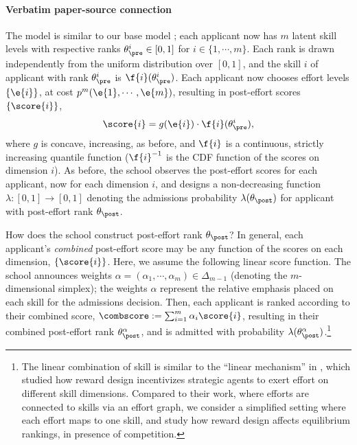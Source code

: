 \documentclass[10pt]{article}
\begin{document}
\paragraph{Verbatim paper-source connection}
\begin{ReviewVerbatim}
 The model is similar to our base model ; each applicant now has $m$ latent skill levels with respective ranks $\theta_\pre^i \in [0,1]$ for $i\in \{1, \cdots, m\}$. Each rank is drawn independently from the uniform distribution over $[0,1]$, and the skill $i$ of applicant with rank $\theta_\pre^i$ is $\f{i}(\theta_\pre^i)$. Each applicant now chooses effort levels $\{ \e{i} \}$, at cost $p^m( \e{1}, \cdots, \e{m})$, resulting in post-effort scores $\{\score{i}\}$,
\begin{equation*}
\score{i} = g(\e{i})\cdot \f{i}(\theta_\pre^i),
\end{equation*}
where $g$ is concave, increasing, as before, and $\f{i}$ is a continuous, strictly increasing quantile function (${\f{i}}^{-1}$ is the CDF function of the scores on dimension $i$). As before, the school observes the post-effort scores for each applicant, now for each dimension $i$, and designs a non-decreasing function $\lambda : [0,1] \to [0,1]$ denoting the admissions probability $\lambda(\theta_\post)$ for applicant with post-effort rank $\theta_\post$.


How does the school construct post-effort rank $\theta_\post$? In general, each applicant's \textit{combined} post-effort score may be any function of the scores on each dimension, $\{\score{i}\}$. Here, we assume the following linear score function. The school announces weights $\alpha = (\alpha_1, \cdots, \alpha_m) \in \Delta_{m-1}$ (denoting the $m$-dimensional simplex); the weights $\alpha$ represent the relative emphasis placed on each skill for the admissions decision. Then, each applicant is ranked according to their combined score, $\combscore := \sum_{i=1}^m \alpha_i\score{i}$, resulting in their combined post-effort rank $\theta_\post^\alpha$, and is admitted with probability $\lambda(\theta_\post^\alpha)$.\footnote{The linear combination of skill is similar to the ``linear mechanism'' in \citet{kleinberg18investeffort}, which studied how reward design incentivizes strategic agents to exert effort on different skill dimensions. Compared to their work, where efforts are connected to skills via an effort graph, we consider a simplified setting where each effort maps to one skill, and study how reward design affects equilibrium rankings, in presence of competition.}


\end{ReviewVerbatim}
\end{document}
